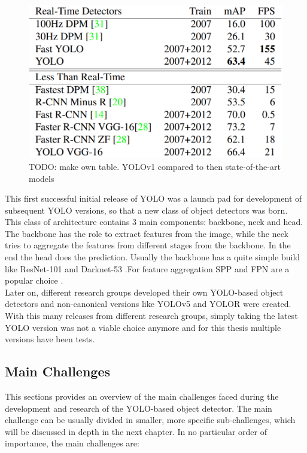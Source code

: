 \begin{figure}[!h]
  \centering
  \includegraphics[width=0.75\linewidth]{images/yolo_images/compare_yolov1}
  \caption{TODO: make own table. YOLOv1 compared to then state-of-the-art models \cite{yolov1_paper}}
\end{figure}


This first successful initial release of YOLO was a launch pad for development of subsequent YOLO versions, so that a new class of object detectors was born. This class of architecture contains 3 main components: backbone, neck and head.
The backbone has the role to extract features from the image, while the neck tries to aggregate the features from different stages from the backbone. In the end the head does the prediction. Usually the backbone has a quite simple build like ResNet-101 and Darknet-53 \cite{yolov3_paper}.For feature aggregation SPP \cite{spp_paper} and FPN \cite{fpn_paper} are a popular choice . \\
Later on, different research groups developed their own YOLO-based object detectors and non-canonical versions like YOLOv5 \cite{yolov5_git} and YOLOR \cite{yolor_paper} were created. With this many releases from different research groups, simply taking the latest YOLO version was not a viable choice anymore and for this thesis multiple versions have been tests.\\

\subsection{Main Challenges} \label{intro:challenges}
This sections provides an overview of the main challenges faced during the development and research of the YOLO-based object detector. The main challenge can be usually divided in smaller, more specific sub-challenges, which will be discussed in depth in the next chapter. In no particular order of importance, the main challenges are:

